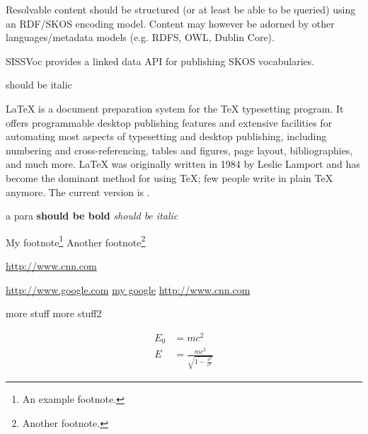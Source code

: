 \documentclass[10pt,a4paper]{article}
\begin{document}
\begin{flushleft}
\begin{subsection}{Resolvable content should be structured (or at least be able to be queried)
  using an RDF/SKOS encoding model. Content may however be adorned by other
  languages/metadata models (e.g. RDFS, OWL, Dublin Core).  }

	SISSVoc provides a linked data API for publishing SKOS vocabularies.


  \begin{textit}{
    should be italic
  }
  \end{textit}


\end{subsection}





  \end{flushleft}




\LaTeX{} is a document preparation system for the \TeX{}
  typesetting program. It offers programmable desktop
  publishing features and extensive facilities for
  automating most aspects of typesetting and desktop
  publishing, including numbering and cross-referencing,
  tables and figures, page layout, bibliographies, and
  much more. \LaTeX{} was originally written in 1984 by
  Leslie Lamport and has become the dominant method for
  using \TeX; few people write in plain \TeX{} anymore.
  The current version is \LaTeXe.

  \begin{flushright}
  a para
  \textbf{should be bold}
  \textit{should be italic}

  \end{flushright}



  \begin{flushleft}
  My footnote\footnote{An example footnote.}
  Another footnote\footnote{Another footnote.}

  \hyperref[cnn]{http://www.cnn.com}

  \url{http://www.google.com}
  \href{http://www.google.com}{my google}
  \href{http://www.cnn.com}{http://www.cnn.com}

  \end{flushleft}
  more stuff
  more stuff2

  \begin{align}
    E_0 &= mc^2                              \\
    E &= \frac{mc^2}{\sqrt{1-\frac{v^2}{c^2}}}
  \end{align}
\end{document}

